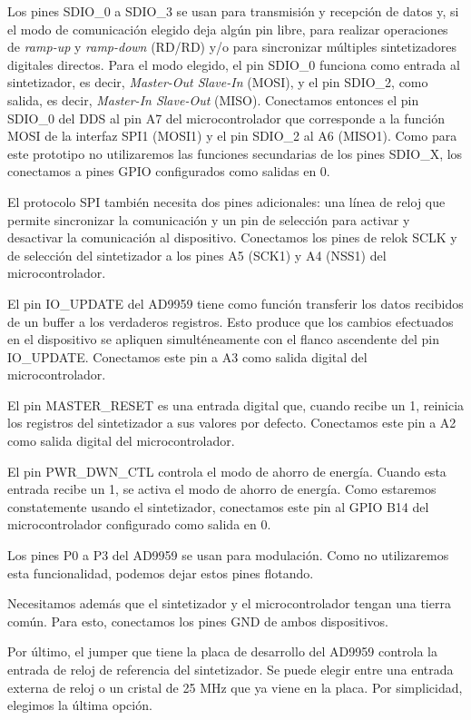 \documentclass{article}
\newenvironment{standalone}{\begin{preview}}{\end{preview}}
\begin{document}
\begin{standalone}
  Los pines SDIO\_0 a SDIO\_3 se usan para transmisión y recepción de datos y, si el modo de comunicación elegido deja algún pin libre, para realizar operaciones de \textit{ramp-up} y \textit{ramp-down} (RD/RD) y/o para sincronizar múltiples sintetizadores digitales directos.
  Para el modo elegido, el pin SDIO\_0 funciona como entrada al sintetizador, es decir, \textit{Master-Out Slave-In} (MOSI), y el pin SDIO\_2, como salida, es decir, \textit{Master-In Slave-Out} (MISO).
  Conectamos entonces el pin SDIO\_0 del DDS al pin A7 del microcontrolador que corresponde a la función MOSI de la interfaz SPI1 (MOSI1) y el pin SDIO\_2 al A6 (MISO1).
  Como para este prototipo no utilizaremos las funciones secundarias de los pines SDIO\_X, los conectamos a pines GPIO configurados como salidas en 0.

  El protocolo SPI también necesita dos pines adicionales: una línea de reloj que permite sincronizar la comunicación y un pin de selección para activar y desactivar la comunicación al dispositivo.
  Conectamos los pines de relok SCLK y de selección  del sintetizador a los pines A5 (SCK1) y A4 (NSS1) del microcontrolador.

  El pin IO\_UPDATE del AD9959 tiene como función transferir los datos recibidos de un buffer a los verdaderos registros.
  Esto produce que los cambios efectuados en el dispositivo se apliquen simulténeamente con el flanco ascendente del pin IO\_UPDATE.
  Conectamos este pin a A3 como salida digital del microcontrolador.

  El pin MASTER\_RESET es una entrada digital que, cuando recibe un 1, reinicia los registros del sintetizador a sus valores por defecto.
  Conectamos este pin a A2 como salida digital del microcontrolador.

  El pin PWR\_DWN\_CTL controla el modo de ahorro de energía.
  Cuando esta entrada recibe un 1, se activa el modo de ahorro de energía.
  Como estaremos constatemente usando el sintetizador, conectamos este pin al GPIO B14 del microcontrolador configurado como salida en 0.

  Los pines P0 a P3 del AD9959 se usan para modulación.
  Como no utilizaremos esta funcionalidad, podemos dejar estos pines flotando.

  Necesitamos además que el sintetizador y el microcontrolador tengan una tierra común.
  Para esto, conectamos los pines GND de ambos dispositivos.

  Por último, el jumper que tiene la placa de desarrollo del AD9959 controla la entrada de reloj de referencia del sintetizador.
  Se puede elegir entre una entrada externa de reloj o un cristal de 25 MHz que ya viene en la placa.
  Por simplicidad, elegimos la última opción.


\end{standalone}
\end{document}
